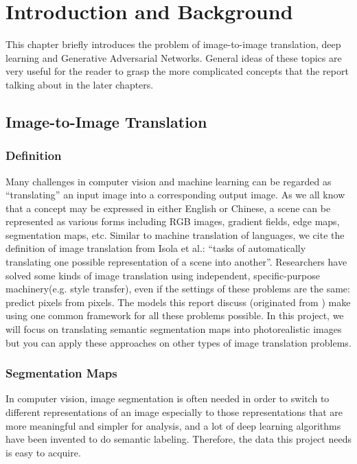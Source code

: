 \chapter{Introduction and Background}
\label{cha:intro}
This chapter briefly introduces the problem of image-to-image translation,
deep learning and Generative Adversarial Networks. General ideas of these topics
are very useful for the reader to grasp the more complicated concepts that 
the report talking about in the later chapters.

\section{Image-to-Image Translation}
\subsection{Definition}
Many challenges in computer vision and machine learning can be regarded as “translating” an 
input image into a corresponding output image. As we all know that a concept may be expressed in either 
English or Chinese, a scene can be represented as various forms including RGB images, gradient fields, 
edge maps, segmentation maps, etc. Similar to machine translation of languages, we cite the definition
of image translation from Isola et al.: “tasks of automatically translating
one possible representation of a scene into another”\cite{pix2pix2016}. Researchers have solved some kinds of image 
translation using independent, specific-purpose machinery(e.g. style transfer\cite{gatys2015neural}),
even if the settings of these problems are the same: predict pixels from pixels.
The models this report discuss (originated from \cite{pix2pix2016})
make using one common framework for all these problems possible.
In this project, we will focus on translating 
semantic segmentation maps into photorealistic images but you can apply these approaches on
other types of image translation problems.

\subsection{Segmentation Maps}
In computer vision, image segmentation is often needed in order to switch to 
different representations of an image especially to those representations that 
are more meaningful and simpler for analysis\cite{wikipedia},
and a lot of deep learning algorithms have been invented to do semantic labeling. Therefore,
the data this project needs is easy to acquire.

